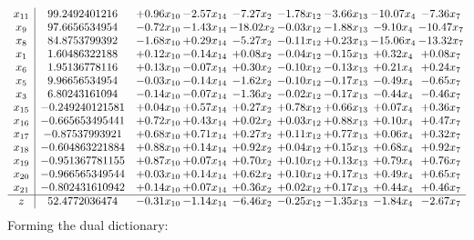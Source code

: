 \documentclass[8pt]{article}
\begin{document}
\[\begin{array}{c| c c@{\hskip 2pt} c@{\hskip 2pt} c@{\hskip 2pt} c@{\hskip 2pt} c@{\hskip 2pt} c@{\hskip 2pt} c@{\hskip 2pt} }
 x_{11}   &  99.2492401216 & +  0.96 x_{10} & -2.57 x_{14} & -7.27 x_{2} & -1.78 x_{12} & -3.66 x_{13} & -10.07 x_{4} & -7.36 x_{7}\\
 x_{9}   &  97.6656534954 & -0.72 x_{10} & -1.43 x_{14} & -18.02 x_{2} & -0.03 x_{12} & -1.88 x_{13} & -9.10 x_{4} & -10.47 x_{7}\\
 x_{8}   &  84.8753799392 & -1.68 x_{10} & +  0.29 x_{14} & -5.27 x_{2} & -0.11 x_{12} & +  0.23 x_{13} & -15.06 x_{4} & -13.32 x_{7}\\
 x_{1}   &  1.60486322188 & +  0.12 x_{10} & -0.14 x_{14} & +  0.08 x_{2} & -0.04 x_{12} & -0.15 x_{13} & +  0.32 x_{4} & +  0.08 x_{7}\\
 x_{6}   &  1.95136778116 & +  0.13 x_{10} & -0.07 x_{14} & +  0.30 x_{2} & -0.10 x_{12} & -0.13 x_{13} & +  0.21 x_{4} & +  0.24 x_{7}\\
 x_{5}   &  9.96656534954 & -0.03 x_{10} & -0.14 x_{14} & -1.62 x_{2} & -0.10 x_{12} & -0.17 x_{13} & -0.49 x_{4} & -0.65 x_{7}\\
 x_{3}   &  6.80243161094 & -0.14 x_{10} & -0.07 x_{14} & -1.36 x_{2} & -0.02 x_{12} & -0.17 x_{13} & -0.44 x_{4} & -0.46 x_{7}\\
 x_{15}   &  -0.249240121581 & +  0.04 x_{10} & +  0.57 x_{14} & +  0.27 x_{2} & +  0.78 x_{12} & +  0.66 x_{13} & +  0.07 x_{4} & +  0.36 x_{7}\\
 x_{16}   &  -0.665653495441 & +  0.72 x_{10} & +  0.43 x_{14} & +  0.02 x_{2} & +  0.03 x_{12} & +  0.88 x_{13} & +  0.10 x_{4} & +  0.47 x_{7}\\
 x_{17}   &  -0.87537993921 & +  0.68 x_{10} & +  0.71 x_{14} & +  0.27 x_{2} & +  0.11 x_{12} & +  0.77 x_{13} & +  0.06 x_{4} & +  0.32 x_{7}\\
 x_{18}   &  -0.604863221884 & +  0.88 x_{10} & +  0.14 x_{14} & +  0.92 x_{2} & +  0.04 x_{12} & +  0.15 x_{13} & +  0.68 x_{4} & +  0.92 x_{7}\\
 x_{19}   &  -0.951367781155 & +  0.87 x_{10} & +  0.07 x_{14} & +  0.70 x_{2} & +  0.10 x_{12} & +  0.13 x_{13} & +  0.79 x_{4} & +  0.76 x_{7}\\
 x_{20}   &  -0.966565349544 & +  0.03 x_{10} & +  0.14 x_{14} & +  0.62 x_{2} & +  0.10 x_{12} & +  0.17 x_{13} & +  0.49 x_{4} & +  0.65 x_{7}\\
 x_{21}   &  -0.802431610942 & +  0.14 x_{10} & +  0.07 x_{14} & +  0.36 x_{2} & +  0.02 x_{12} & +  0.17 x_{13} & +  0.44 x_{4} & +  0.46 x_{7}\\
\hline
z    &  52.4772036474 & -0.31 x_{10} & -1.14 x_{14} & -6.46 x_{2} & -0.25 x_{12} & -1.35 x_{13} & -1.84 x_{4} & -2.67 x_{7}\\
\end{array}\]
Forming the dual dictionary:
\end{document}
